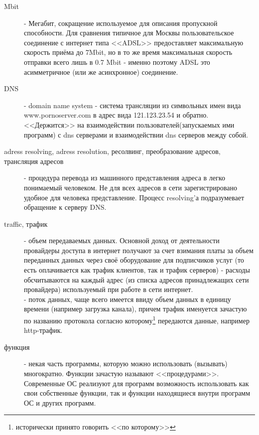 \begin{description}
\item[Mbit]
 - Мегабит, сокращение используемое для описания пропускной
способности. Для сравнения типичное для Москвы пользовательское соединение
с интернет типа <<ADSL>> предоставляет максимальную скорость приёма до 7Mbit,
но в то же время максимальная скорость отправки всего лишь в 0.7 Mbit - именно
поэтому ADSL это асимметричное (или же асинхронное) соединение.

\item[DNS]
 - domain name system - система трансляции из символьных имен вида
www.pornoserver.com в адрес вида 121.123.23.54 и обратно. <<Держится>> на взаимодействии
пользователей(запускаемых ими программ) с dns серверами и взаимодействии dns серверов между
собой.

\item[adress resolving, adress resolution, ресолвинг, преобразование адресов, трансляция адресов ]
- процедура перевода из машинного представления адреса в легко понимаемый человеком. Не для всех адресов
в сети зарегистрировано удобное для человека представление. Процесс resolving'а подразумевает
обращение к серверу DNS.

\item[traffic, трафик]
 - объем передаваемых данных. Основной доход от деятельности провайдеры
доступа в интернет получают за счет взимания платы за объем переданных
данных через своё оборудование для подписчиков услуг (то есть оплачивается как
трафик клиентов, так и трафик серверов) - расходы обсчитываются на каждый адрес
(из списка адресов принадлежащих сети провайдера) используемый при работе
в сети интернет.\\
 - поток данных, чаще всего имеется ввиду объем данных в единицу
времени (например загрузка канала), причем трафик именуется зачастую по
названию протокола согласно которому\footnote{исторически принято говорить
<<по которому>>} передаются данные, например http-трафик.

\item[функция]
 - некая часть программы, которую можно использовать (вызывать)
многократно. Функции зачастую называют <<процедурами>>. Современные ОС реализуют
для программ возможность использовать как свои собственные функции, так и
функции находящиеся внутри программ ОС и других программ.


\end{description}
